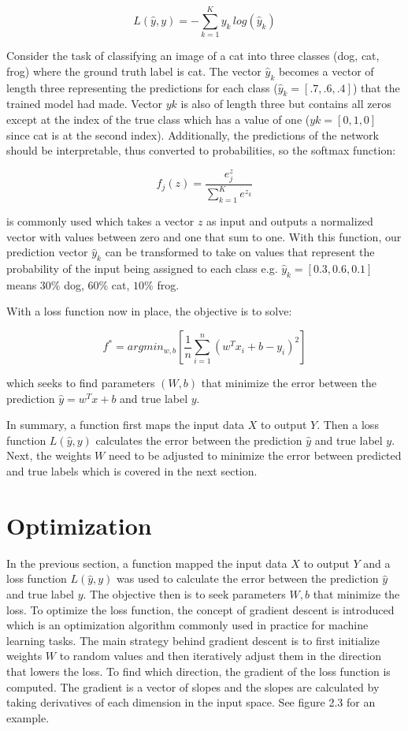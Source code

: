 \documentclass[12pt]{report}
\begin{document}
\begin{equation}
L(\hat{y},y)=-\sum_{k=1}^{K} y_k  \, log(\hat{y}_k)
\end{equation}

Consider the task of classifying an image of a cat into three classes (dog, cat, frog) where the ground truth label is cat. The vector $\hat{y}_k$ becomes a vector of length three representing the predictions for each class ($\hat{y}_k=[.7,.6,.4]$) that the trained model had made. Vector $yk$ is also of length three but contains all zeros except at the index of the true class which has a value of one ($yk=[0,1,0]$ since cat is at the second index).  Additionally, the predictions of the network should be interpretable, thus converted to probabilities, so the softmax function:

\begin{equation}
f_j(z)=\frac{e^z_j}{\sum_{k=1}^{K}e^{z_k}}
\end{equation}

is commonly used which takes a vector $z$ as input and outputs a normalized vector with values between zero and one that sum to one. With this function, our prediction vector $\hat{y}_k$ can be transformed to take on values that represent the probability of the input being assigned to each class e.g. $\hat{y}_k=[0.3,0.6,0.1]$ means $30\%$ dog, $60\%$ cat, $10\%$ frog.

With a loss function now in place, the objective is to solve:

\begin{equation}
f^* = argmin_{w,b}[\frac{1}{n}\sum_{i=1}^n(w^Tx_i+b-y_i)^2]
\end{equation}

\noindent which seeks to find parameters $(W, b)$ that minimize the error between the prediction $\hat{y}=w^Tx+b$ and true label $y$.

In summary, a function first maps the input data $X$ to output  $Y$. Then a loss function $L(\hat{y},y)$ calculates the error between the prediction $\hat{y}$ and true label $y$. Next, the weights $W$ need to be adjusted to minimize the error between predicted and true labels which is covered in the next section.


\section{Optimization}
In the previous section, a function mapped the input data $X$ to output $Y$ and a loss function $L(\hat{y},y)$ was used to calculate the error between the prediction $\hat{y}$ and true label $y$.
The objective then is to seek parameters $W,b$ that minimize the loss. To optimize the loss function, the concept of gradient descent is introduced which is an optimization algorithm commonly used in practice for machine learning tasks.  The main strategy behind gradient descent is to first initialize weights $W$ to random values and then iteratively adjust them in the direction that lowers the loss. To find which direction, the gradient of the loss function is computed.  The gradient is a vector of slopes and the slopes are calculated by taking derivatives of each dimension in the input space. See figure 2.3 for an example.
\end{document}
